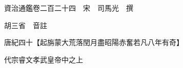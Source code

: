 










 


 
 


 

  
  
  
  
  





  
  
  
  
  
 
  

  

  
  
  



  

 
 

  
   




  

  
  


  　　資治通鑑卷二百二十四　宋　司馬光　撰

　　胡三省　音註

　　唐紀四十【起旃蒙大荒落閏月盡昭陽赤奮若凡八年有奇】

　　代宗睿文孝武皇帝中之上

